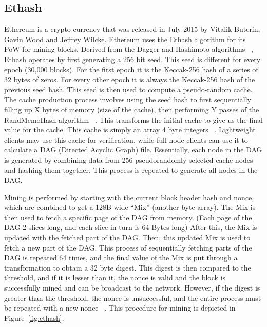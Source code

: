 \documentclass[runningheads]{llncs}
\begin{document}
\subsection{Ethash}
Ethereum is a crypto-currency that was released in July 2015 by Vitalik Buterin, Gavin Wood and Jeffrey Wilcke. Ethereum uses the Ethash algorithm for its PoW for mining blocks. Derived from the Dagger and Hashimoto algorithms ~\cite{dagger-hashimoto}, Ethash operates by first generating a 256 bit seed. This seed is different for every epoch (30,000 blocks). For the first epoch it is the Keccak-256 hash of a series of 32 bytes of zeros. For every other epoch it is always the Keccak-256 hash of the previous seed hash. This seed is then used to compute a pseudo-random cache. The cache production process involves using the seed hash to first sequentially filling up X bytes of memory (size of the cache), then performing Y passes of the RandMemoHash algorithm ~\cite{randmemohash}. This transforms the initial cache to give us the final value for the cache. This cache is simply an array 4 byte integers ~\cite{Ethmining}. Lightweight clients may use this cache for verification, while full node clients can use it to calculate a DAG (Directed Acyclic Graph) file. Essentially, each node in the DAG is generated by combining data from 256 pseudorandomly selected cache nodes and hashing them together. This process is repeated to generate all nodes in the DAG. 


Mining is performed by starting with the current block header hash and nonce, which are combined to get a 128B wide ``Mix'' (another byte array). The Mix is then used to fetch a specific page of the DAG from memory. (Each page of the DAG 2 slices long, and each slice in turn is 64 Bytes long) After this, the Mix is updated with the fetched part of the DAG. Then, this updated Mix is used to fetch a new part of the DAG. This process of sequentially fetching parts of the DAG is repeated 64 times, and the final value of the Mix is put through a transformation to obtain a 32 byte digest. This digest is then compared to the threshold, and if it is lesser than it, the nonce is valid and the block is successfully mined and can be broadcast to the network. However, if the digest is greater than the threshold, the nonce is unsuccessful, and the entire process must be repeated with a new nonce ~\cite{Ethmining}. This procedure for mining is depicted in Figure~\ref{fig:ethash}. 
\end{document}
